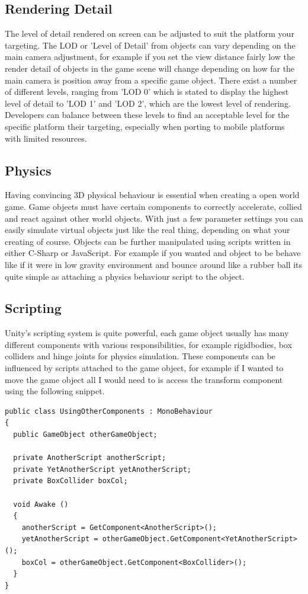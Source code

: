 \subsection{Rendering Detail}
The level of detail rendered on screen can be adjusted to suit the platform your targeting. The LOD or 'Level of Detail' from objects can vary depending on the main camera adjustment, for example if you set the view distance fairly low the render detail of objects in the game scene will change depending on how far the main camera is position away from a specific game object. There exist a number of different levels, ranging from 'LOD 0' which is stated to display the highest level of detail to 'LOD 1' and 'LOD 2', which are the lowest level of rendering. Developers can balance between these levels to find an acceptable level for the specific platform their targeting, especially when porting to mobile platforms with limited resources.

\subsection{Physics}
Having convincing 3D physical behaviour is essential when creating a open world game. Game objects must have certain components to correctly accelerate, collied and react against other world objects. With just a few parameter settings you can easily simulate virtual objects just like the real thing, depending on what your creating of course. Objects can be further manipulated using scripts written in either C-Sharp or JavaScript. For example if you wanted and object to be behave like if it were in low gravity environment and bounce around like a rubber ball its quite simple as attaching a physics behaviour script to the object. 

\subsection{Scripting}
Unity's scripting system is quite powerful, each game object usually has many different components with various responsibilities, for example rigidbodies, box colliders and hinge joints for physics simulation. These components can be influenced by scripts attached to the game object, for example if I wanted to move the game object all I would need to is access the transform component using the following snippet.

\begin{verbatim}
public class UsingOtherComponents : MonoBehaviour
{
  public GameObject otherGameObject;

  private AnotherScript anotherScript;
  private YetAnotherScript yetAnotherScript;
  private BoxCollider boxCol;

  void Awake ()
  {
    anotherScript = GetComponent<AnotherScript>();
    yetAnotherScript = otherGameObject.GetComponent<YetAnotherScript>();
    boxCol = otherGameObject.GetComponent<BoxCollider>();
  }
}
\end{verbatim}

